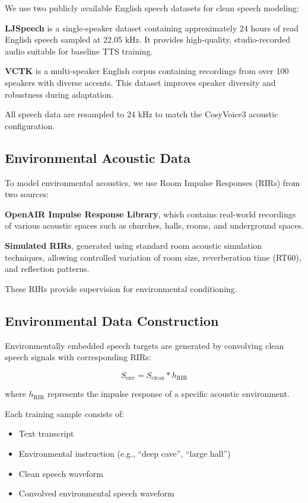 \documentclass{article}
\begin{document}
We use two publicly available English speech datasets for clean speech modeling:

\textbf{LJSpeech} is a single-speaker dataset containing approximately 24 hours of read English speech sampled at 22.05 kHz. It provides high-quality, studio-recorded audio suitable for baseline TTS training.

\textbf{VCTK} is a multi-speaker English corpus containing recordings from over 100 speakers with diverse accents. This dataset improves speaker diversity and robustness during adaptation.

All speech data are resampled to 24 kHz to match the CosyVoice3 acoustic configuration.

\subsection{Environmental Acoustic Data}

To model environmental acoustics, we use Room Impulse Responses (RIRs) from two sources:

\textbf{OpenAIR Impulse Response Library}, which contains real-world recordings of various acoustic spaces such as churches, halls, rooms, and underground spaces.

\textbf{Simulated RIRs}, generated using standard room acoustic simulation techniques, allowing controlled variation of room size, reverberation time (RT60), and reflection patterns.

These RIRs provide supervision for environmental conditioning.

\subsection{Environmental Data Construction}

Environmentally embedded speech targets are generated by convolving clean speech signals with corresponding RIRs:

\[
S_{\text{env}} = S_{\text{clean}} * h_{\text{RIR}}
\]

where $h_{\text{RIR}}$ represents the impulse response of a specific acoustic environment.

Each training sample consists of:

\begin{itemize}
    \item Text transcript
    \item Environmental instruction (e.g., ``deep cave'', ``large hall'')
    \item Clean speech waveform
    \item Convolved environmental speech waveform
\end{itemize}
\end{document}
